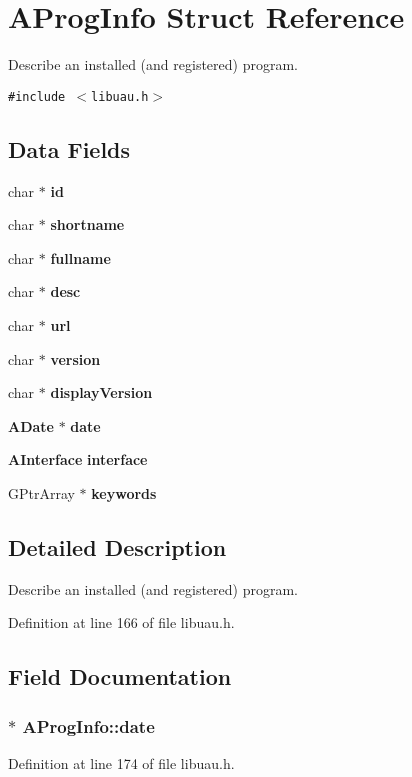 \section{AProg\-Info Struct Reference}
\label{structAProgInfo}
Describe an installed (and registered) program.  


{\tt \#include $<$libuau.h$>$}

\subsection*{Data Fields}
\begin{CompactItemize}
\item 
char $\ast$ {\bf id}
\item 
char $\ast$ {\bf shortname}
\item 
char $\ast$ {\bf fullname}
\item 
char $\ast$ {\bf desc}
\item 
char $\ast$ {\bf url}
\item 
char $\ast$ {\bf version}
\item 
char $\ast$ {\bf display\-Version}
\item 
{\bf ADate} $\ast$ {\bf date}
\item 
{\bf AInterface} {\bf interface}
\item 
GPtr\-Array $\ast$ {\bf keywords}
\end{CompactItemize}


\subsection{Detailed Description}
Describe an installed (and registered) program. 



Definition at line 166 of file libuau.h.

\subsection{Field Documentation}
\subsubsection{$\ast$ {\bf AProg\-Info::date}}\label{structAProgInfo_o7}




Definition at line 174 of file libuau.h.

